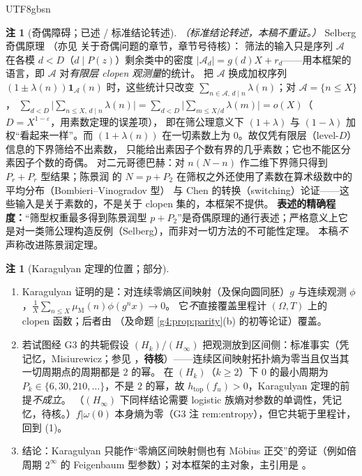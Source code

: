 \documentclass[11pt,a4paper]{article}
\newcommand{\Om}{\Omega}               %
\newcommand{\Mob}{\mu_{\mathrm{M}}}    %
\newcommand{\Liou}{\lambda}            %
\theoremstyle{plain}
\theoremstyle{definition}
\newtheorem{rem}[lem]{注}
\begin{document}
\begin{CJK}{UTF8}{gbsn}
\begin{rem}[奇偶障碍；已述 / 标准结论转述]\label{g4:rem:selberg}
\emph{（标准结论转述，本稿不重证。）} Selberg 奇偶原理 \cite{Sel49}（亦见 \cite{FI10} 关于奇偶问题的章节，章节号待核）：
筛法的输入只是序列 $\mathcal A$ 在各模 $d<D$（$d\mid P(z)$）剩余类中的密度 $|\mathcal A_d|=g(d)X+r_d$——用本框架的语言，即 $\mathcal A$ 对\emph{有限层 clopen 观测量}的统计。
把 $\mathcal A$ 换成加权序列 $(1\pm\Liou(n))\mathbf 1_{\mathcal A}(n)$ 时，这些统计只改变 $\sum_{n\in\mathcal A,\,d\mid n}\Liou(n)$；对 $\mathcal A=\{n\le X\}$，
$\sum_{d<D}\bigl|\sum_{n\le X,\,d\mid n}\Liou(n)\bigr|=\sum_{d<D}\bigl|\sum_{m\le X/d}\Liou(m)\bigr|=o(X)$（$D=X^{1-\varepsilon}$，用素数定理的误差项），
即在筛公理意义下 $(1+\Liou)$ 与 $(1-\Liou)$ 加权“看起来一样”。而 $(1+\Liou(n))$ 在一切素数上为 $0$。故仅凭有限层（level-$D$）信息的下界筛给不出素数，
只能给出素因子个数有界的几乎素数；它也不能区分素因子个数的奇偶。
对二元哥德巴赫：对 $n(N-n)$ 作二维下界筛只得到 $P_r+P_r$ 型结果；陈景润 \cite{Chen73} 的 $N=p+P_2$ 在筛权之外还使用了素数在算术级数中的平均分布（Bombieri--Vinogradov 型）
与 Chen 的转换（switching）论证——这些输入是关于素数的，不是关于 clopen 集的，本框架不提供。
\textbf{表述的精确程度：}“筛型权重最多得到陈景润型 $p+P_2$”是奇偶原理的通行表述；严格意义上它是对一类筛公理构造反例（Selberg），而非对一切方法的不可能性定理。
本稿\emph{不}声称改进陈景润定理。
\end{rem}

\begin{rem}[Karagulyan 定理的位置；部分]\label{g4:rem:karagulyan}
\begin{enumerate}[leftmargin=*,label=(\arabic*)]
\item Karagulyan \cite{Kar15} 证明的是：对连续零熵区间映射（及保向圆同胚）$g$ 与连续观测 $\phi$，$\frac1X\sum_{n\le X}\Mob(n)\phi(g^nx)\to0$。
它\emph{不}直接覆盖里程计 $(\Om,T)$ 上的 clopen 函数；后者由 \cite{DK15}（及命题 \ref{g4:prop:parity}(b) 的初等论证）覆盖。
\item 若试图经 G3 的共轭假设 $(H_k)$/$(H_\infty)$ 把观测放到区间侧：标准事实（凭记忆，Misiurewicz；参见 \cite{BC92}，\textbf{待核}）——连续区间映射拓扑熵为零当且仅当其一切周期点的周期都是 $2$ 的幂。
在 $(H_k)$（$k\ge2$）下 $0$ 的最小周期为 $P_k\in\{6,30,210,\dots\}$，不是 $2$ 的幂，故 $h_{\mathrm{top}}(f_u)>0$，Karagulyan 定理的前提\emph{不成立}。
（$(H_\infty)$ 下同样结论需要 logistic 族熵对参数的单调性，凭记忆，待核。）$f|\omega(0)$ 本身熵为零（G3 注 rem:entropy），但它共轭于里程计，回到 (1)。
\item 结论：Karagulyan 只能作“零熵区间映射侧也有 M\"obius 正交”的旁证（例如倍周期 $2^\infty$ 的 Feigenbaum 型参数）；对本框架的主对象，主引用是 \cite{DK15,Sar10}。
\end{enumerate}
\end{rem}


\end{CJK}
\end{document}

